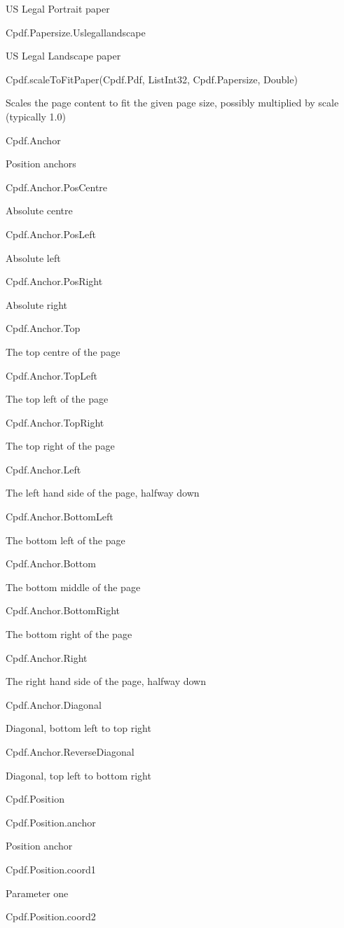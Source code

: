 US Legal Portrait paper

Cpdf.Papersize.Uslegallandscape

US Legal Landscape paper

Cpdf.scaleToFitPaper(Cpdf.Pdf, List{Int32}, Cpdf.Papersize, Double)

Scales the page content
to fit the given page size, possibly multiplied by scale (typically 1.0)

Cpdf.Anchor

Position anchors

Cpdf.Anchor.PosCentre

Absolute centre

Cpdf.Anchor.PosLeft

Absolute left

Cpdf.Anchor.PosRight

Absolute right

Cpdf.Anchor.Top

The top centre of the page

Cpdf.Anchor.TopLeft

The top left of the page

Cpdf.Anchor.TopRight

The top right of the page

Cpdf.Anchor.Left

The left hand side of the page, halfway down

Cpdf.Anchor.BottomLeft

The bottom left of the page

Cpdf.Anchor.Bottom

The bottom middle of the page

Cpdf.Anchor.BottomRight

The bottom right of the page

Cpdf.Anchor.Right

The right hand side of the page, halfway down

Cpdf.Anchor.Diagonal

Diagonal, bottom left to top right

Cpdf.Anchor.ReverseDiagonal

Diagonal, top left to bottom right

Cpdf.Position

Cpdf.Position.anchor

Position anchor

Cpdf.Position.coord1

Parameter one

Cpdf.Position.coord2

